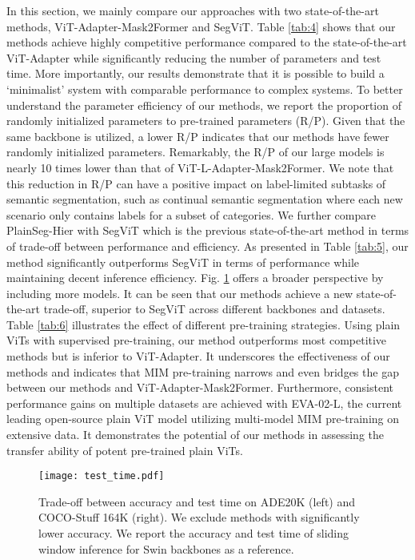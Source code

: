 \documentclass{article} \usepackage{iclr2024_conference,times}
\begin{document}
In this section, we mainly compare our approaches with two state-of-the-art methods, ViT-Adapter-Mask2Former and SegViT. Table \ref{tab:4} shows that our methods achieve highly competitive performance compared to the state-of-the-art ViT-Adapter while significantly reducing the number of parameters and test time. More importantly, our results demonstrate that it is possible to build a `minimalist' system with comparable performance to complex systems. To better understand the parameter efficiency of our methods, we report the proportion of randomly initialized parameters to pre-trained parameters (R/P). Given that the same backbone is utilized, a lower R/P indicates that our methods have fewer randomly initialized parameters. Remarkably, the R/P of our large models is nearly 10 times lower than that of ViT-L-Adapter-Mask2Former. We note that this reduction in R/P can have a positive impact on label-limited subtasks of semantic segmentation, such as continual semantic segmentation where each new scenario only contains labels for a subset of categories. We further compare PlainSeg-Hier with SegViT which is the previous state-of-the-art method in terms of trade-off between performance and efficiency. As presented in Table \ref{tab:5}, our method significantly outperforms SegViT in terms of performance while maintaining decent inference efficiency. Fig. \ref{fig2} offers a broader perspective by including more models. It can be seen that our methods achieve a new state-of-the-art trade-off, superior to SegViT across different backbones and datasets. Table \ref{tab:6} illustrates the effect of different pre-training strategies. Using plain ViTs with supervised pre-training, our method outperforms most competitive methods but is inferior to ViT-Adapter. It underscores the effectiveness of our methods and indicates that MIM pre-training narrows and even bridges the gap between our methods and ViT-Adapter-Mask2Former. Furthermore, consistent performance gains on multiple datasets are achieved with EVA-02-L, the current leading open-source plain ViT model utilizing multi-model MIM pre-training on extensive data. It demonstrates the potential of our methods in assessing the transfer ability of potent pre-trained plain ViTs.




\begin{figure}
  \centerline{\texttt{[image: test\_time.pdf]}}
  \caption{Trade-off between accuracy and test time on ADE20K (left) and COCO-Stuff 164K (right). We exclude methods with significantly lower accuracy. We report the accuracy and test time of sliding window inference for Swin backbones as a reference.}
  \label{fig2}
\end{figure}
\end{document}
